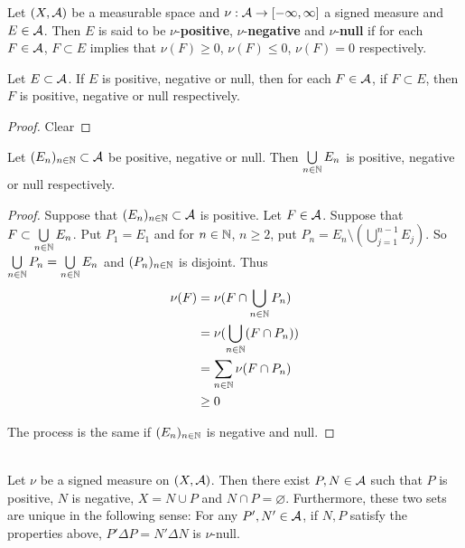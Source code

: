\documentclass{book}
\begin{document}
	\begin{defn}  
		Let $(X, \mathcal{A})$ be a measurable space and $\nu: \mathcal{A} \rightarrow [-\infty, \infty]$ a signed measure and $E \in \mathcal{A}$. Then $E$ is said to be $\nu$-\textbf{positive}, $\nu$-\textbf{negative} and $\nu$-\textbf{null} if for each $F \in \mathcal{A}$, $F \subset E$ implies that $\nu(F) \geq 0$, $\nu(F) \leq 0$, $\nu(F) = 0$ respectively.
	\end{defn}
	
	\begin{ex}  
		Let $E \subset \mathcal{A}$. If $E$ is positive, negative or null, then for each $F \in \mathcal{A}$, if $F \subset E$, then $F$ is positive, negative or null respectively.
	\end{ex}
	
	\begin{proof}
		Clear
	\end{proof}
	
	\begin{ex}  
		Let $(E_n)_{n \in \mathbb{N}} \subset \mathcal{A}$ be positive, negative or null. Then $\bigcup\limits_{n \in \mathbb{N}} E_n$ is positive, negative or null respectively. 
	\end{ex}
	
	\begin{proof}
		Suppose that $(E_n)_{n \in \mathbb{N}} \subset \mathcal{A}$ is positive. Let $F \in \mathcal{A}$. Suppose that $F \subset \bigcup\limits_{n \in \mathbb{N}} E_n$. Put $P_1 = E_1$ and for $n \in \mathbb{N}$, $n \geq 2$, put $P_n = E_n \setminus (\bigcup\limits_{j=1}^{n-1} E_j)$. So $\bigcup\limits_{n \in \mathbb{N}} P_n = \bigcup\limits_{n \in \mathbb{N}} E_n$ and $(P_n)_{n \in \mathbb{N}}$ is disjoint. Thus 
		\begin{align*}
			\nu(F) 
			&= \nu(F \cap \bigcup_{n \in \mathbb{N}} P_n)\\
			&= \nu(\bigcup_{n \in \mathbb{N}} (F \cap P_n))\\
			&= \sum_{n \in \mathbb{N}} \nu(F \cap P_n)\\
			& \geq 0 
		\end{align*}
		
		The process is the same if $(E_n)_{n \in \mathbb{N}}$ is negative and null.
	\end{proof}
	
	\begin{thm}  \\
		Let $\nu$ be a signed measure on $(X, \mathcal{A})$. Then there exist $P,N \in \mathcal{A}$ such that $P$ is positive, $N$ is negative, $X = N \cup P$ and $N \cap P = \varnothing$. Furthermore, these two sets are unique in the following sense: For any $P',N' \in \mathcal{A}$, if $N,P$ satisfy the properties above, $P' \Delta P = N' \Delta N$ is $\nu$-null.
	\end{thm}
	
\end{document}
